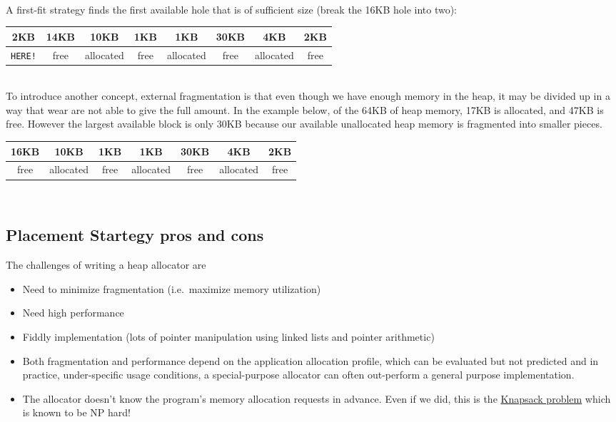 \\
A first-fit strategy finds the first available hole that is of sufficient size (break the 16KB hole into two):
\\
\begin{center}
\begin{tabular}{ | c | c | c | c | c | c | c | c | }
\hline
2KB & 14KB & 10KB & 1KB & 1KB & 30KB & 4KB & 2KB \\ \hline
\texttt{HERE!} & free & allocated & free & allocated & free & allocated & free \\
\hline
\end{tabular}
\end{center}
\\

To introduce another concept, external fragmentation is that even though we have enough memory in the heap, it may be divided up in a way that wear are not able to give the full amount.
In the example below, of the 64KB of heap memory, 17KB is allocated, and 47KB is free.
However the largest available block is only 30KB because our available unallocated heap memory is fragmented into smaller pieces.
\\
\begin{center}
\begin{tabular}{ | c | c | c | c | c | c | c | }
\hline
16KB & 10KB & 1KB & 1KB & 30KB & 4KB & 2KB \\ \hline
free & allocated & free & allocated & free & allocated & free \\
\hline
\end{tabular}
\end{center}
\\

\subsection{Placement Startegy pros and cons}

The challenges of writing a heap allocator are 
\begin{itemize}
\item Need to minimize fragmentation (i.e.~maximize memory utilization) 
\item Need high performance 
\item Fiddly implementation (lots of pointer manipulation using linked lists and pointer arithmetic)
\item Both fragmentation and performance depend on the application allocation profile, which can be evaluated but not predicted and in practice, under-specific usage conditions, a special-purpose allocator can often out-perform a general purpose implementation. 
\item The allocator doesn't know the program's memory allocation requests in advance. Even if we did, this is the \href{http://en.wikipedia.org/wiki/Knapsack_problem}{Knapsack problem} which is known to be NP hard!
\end{itemize}

